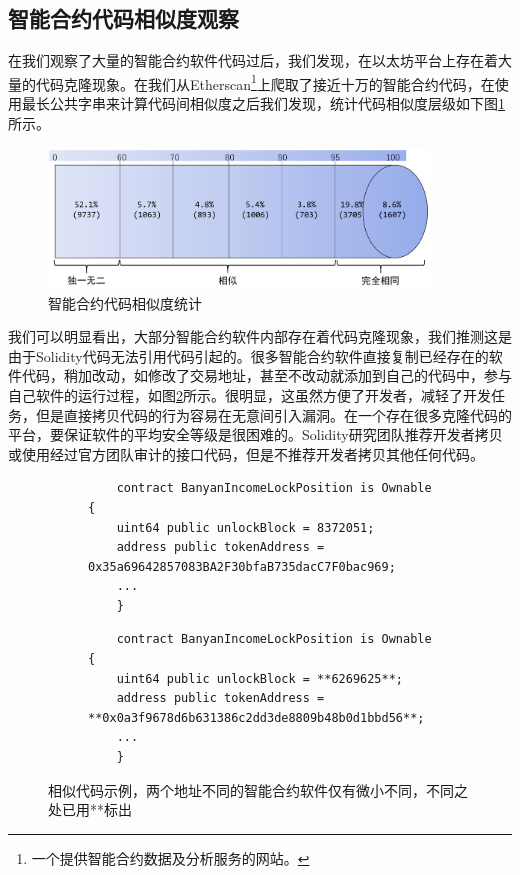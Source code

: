 \subsection{智能合约代码相似度观察}
在我们观察了大量的智能合约软件代码过后，我们发现，在以太坊平台上存在着大量的代码克隆现象。在我们从Etherscan\footnote{一个提供智能合约数据及分析服务的网站。}上爬取了接近十万的智能合约代码，在使用最长公共字串来计算代码间相似度之后我们发现，统计代码相似度层级如下图\ref{fig:similarity}所示。
\begin{figure}[htbp]
\vspace{+2mm}
  \centering
  \includegraphics[width=0.9\textwidth]{figures/similarity.png}
  \caption{智能合约代码相似度统计}
  \label{fig:similarity}
\vspace{-5mm}
\end{figure}
我们可以明显看出，大部分智能合约软件内部存在着代码克隆现象，我们推测这是由于Solidity代码无法引用代码引起的。很多智能合约软件直接复制已经存在的软件代码，稍加改动，如修改了交易地址，甚至不改动就添加到自己的代码中，参与自己软件的运行过程，如图\ref{fig:similar_code}所示。很明显，这虽然方便了开发者，减轻了开发任务，但是直接拷贝代码的行为容易在无意间引入漏洞。在一个存在很多克隆代码的平台，要保证软件的平均安全等级是很困难的。Solidity研究团队推荐开发者拷贝或使用经过官方团队审计的接口代码，但是不推荐开发者拷贝其他任何代码。
\begin{figure}[H]
    \centering
    \begin{subfigure}{\linewidth}
    \centering
    \begin{minipage}{1.0\linewidth}
    \begin{lstlisting}
    contract BanyanIncomeLockPosition is Ownable {
    uint64 public unlockBlock = 8372051;
    address public tokenAddress = 0x35a69642857083BA2F30bfaB735dacC7F0bac969;
    ...
    }
    \end{lstlisting}
    \end{minipage}
    \end{subfigure}
    \quad
    \begin{subfigure}{\linewidth}
    \centering
    \begin{minipage}{1.0\linewidth}
    \begin{lstlisting}
    contract BanyanIncomeLockPosition is Ownable {
    uint64 public unlockBlock = **6269625**;
    address public tokenAddress = **0x0a3f9678d6b631386c2dd3de8809b48b0d1bbd56**;
    ...
    }
    \end{lstlisting}
    \end{minipage}
    \end{subfigure}
    \caption{相似代码示例，两个地址不同的智能合约软件仅有微小不同，不同之处已用**标出}
    \label{fig:similar_code}
\end{figure}

